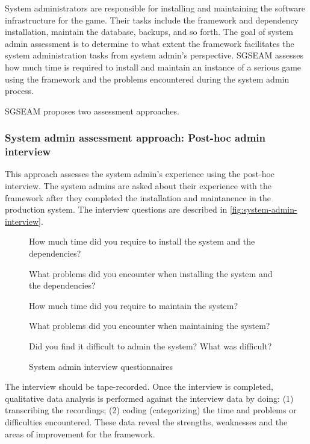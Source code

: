 \documentclass[11pt,oneside]{book}
\begin{document}
System administrators are responsible for installing and maintaining the software infrastructure
for the game. Their tasks include the framework and dependency installation, maintain the database, 
backups, and so forth. The goal of system admin assessment is to determine to what extent the 
framework facilitates the system administration tasks from system admin's perspective. SGSEAM 
assesses how much time is required to install and maintain an instance of a serious game using the 
framework and the problems encountered  during the system admin process.
 
SGSEAM proposes two assessment approaches.

\subsubsection{System admin assessment approach: Post-hoc admin interview}
\label{Post-hoc system admin interview}

This approach assesses the system admin's experience using the post-hoc interview. The system admins 
are asked about their experience with the framework after they completed the installation and maintanence
 in the production system. The interview questions are described in \autoref{fig:system-admin-interview}.

\begin{figure}[ht!]
\begin{mybox}
\begin{compactenum}
\item How much time did you require to install the system and the dependencies?
\item What problems did you encounter when installing the system and the dependencies?
\item How much time did you require to maintain the system?
\item What problems did you encounter when maintaining the system?
\item Did you find it difficult to admin the system? What was difficult?
\end{compactenum}
\end{mybox}
\caption{System admin interview questionnaires}
\label{fig:system-admin-interview}  
\end{figure}

The interview should be tape-recorded. Once the interview is completed, qualitative data
analysis is performed against the interview data by doing: (1) transcribing the recordings; 
(2) coding (categorizing) the time and problems or difficulties encountered. These data reveal the 
strengths, weaknesses and the areas of improvement for the framework.
\end{document}
